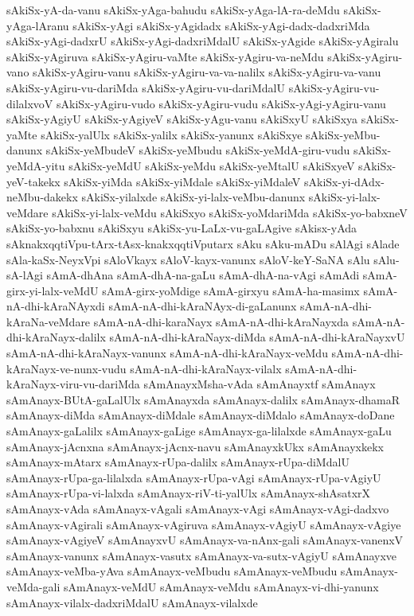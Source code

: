 {sAkiSx-yA-da-vanu
sAkiSx-yAga-bahudu
sAkiSx-yAga-lA-ra-deMdu
sAkiSx-yAga-lAranu
sAkiSx-yAgi
sAkiSx-yAgidadx
sAkiSx-yAgi-dadx-dadxriMda
sAkiSx-yAgi-dadxrU
sAkiSx-yAgi-dadxriMdalU
sAkiSx-yAgide
sAkiSx-yAgiralu
sAkiSx-yAgiruva
sAkiSx-yAgiru-vaMte
sAkiSx-yAgiru-va-neMdu
sAkiSx-yAgiru-vano
sAkiSx-yAgiru-vanu
sAkiSx-yAgiru-va-va-nalilx
sAkiSx-yAgiru-va-vanu
sAkiSx-yAgiru-vu-dariMda
sAkiSx-yAgiru-vu-dariMdalU
sAkiSx-yAgiru-vu-dilalxvoV
sAkiSx-yAgiru-vudo
sAkiSx-yAgiru-vudu
sAkiSx-yAgi-yAgiru-vanu
sAkiSx-yAgiyU
sAkiSx-yAgiyeV
sAkiSx-yAgu-vanu
sAkiSxyU
sAkiSxya
sAkiSx-yaMte
sAkiSx-yalUlx
sAkiSx-yalilx
sAkiSx-yanunx
sAkiSxye
sAkiSx-yeMbu-danunx
sAkiSx-yeMbudeV
sAkiSx-yeMbudu
sAkiSx-yeMdA-giru-vudu
sAkiSx-yeMdA-yitu
sAkiSx-yeMdU
sAkiSx-yeMdu
sAkiSx-yeMtalU
sAkiSxyeV
sAkiSx-yeV-takekx
sAkiSx-yiMda
sAkiSx-yiMdale
sAkiSx-yiMdaleV
sAkiSx-yi-dAdx-neMbu-dakekx
sAkiSx-yilalxde
sAkiSx-yi-lalx-veMbu-danunx
sAkiSx-yi-lalx-veMdare
sAkiSx-yi-lalx-veMdu
sAkiSxyo
sAkiSx-yoMdariMda
sAkiSx-yo-babxneV
sAkiSx-yo-babxnu
sAkiSxyu
sAkiSx-yu-LaLx-vu-gaLAgive
sAkisx-yAda
sAknakxqqtiVpu-tArx-tAsx-knakxqqtiVputarx
sAku
sAku-mADu
sAlAgi
sAlade
sAla-kaSx-NeyxVpi
sAloVkayx
sAloV-kayx-vanunx
sAloV-keY-SaNA
sAlu
sAlu-sA-lAgi
sAmA-dhAna
sAmA-dhA-na-gaLu
sAmA-dhA-na-vAgi
sAmAdi
sAmA-girx-yi-lalx-veMdU
sAmA-girx-yoMdige
sAmA-girxyu
sAmA-ha-masimx
sAmA-nA-dhi-kAraNAyxdi
sAmA-nA-dhi-kAraNAyx-di-gaLanunx
sAmA-nA-dhi-kAraNa-veMdare
sAmA-nA-dhi-karaNayx
sAmA-nA-dhi-kAraNayxda
sAmA-nA-dhi-kAraNayx-dalilx
sAmA-nA-dhi-kAraNayx-diMda
sAmA-nA-dhi-kAraNayxvU
sAmA-nA-dhi-kAraNayx-vanunx
sAmA-nA-dhi-kAraNayx-veMdu
sAmA-nA-dhi-kAraNayx-ve-nunx-vudu
sAmA-nA-dhi-kAraNayx-vilalx
sAmA-nA-dhi-kAraNayx-viru-vu-dariMda
sAmAnayxMsha-vAda
sAmAnayxtf
sAmAnayx
sAmAnayx-BUtA-gaLalUlx
sAmAnayxda
sAmAnayx-dalilx
sAmAnayx-dhamaR
sAmAnayx-diMda
sAmAnayx-diMdale
sAmAnayx-diMdalo
sAmAnayx-doDane
sAmAnayx-gaLalilx
sAmAnayx-gaLige
sAmAnayx-ga-lilalxde
sAmAnayx-gaLu
sAmAnayx-jAcnxna
sAmAnayx-jAcnx-navu
sAmAnayxkUkx
sAmAnayxkekx
sAmAnayx-mAtarx
sAmAnayx-rUpa-dalilx
sAmAnayx-rUpa-diMdalU
sAmAnayx-rUpa-ga-lilalxda
sAmAnayx-rUpa-vAgi
sAmAnayx-rUpa-vAgiyU
sAmAnayx-rUpa-vi-lalxda
sAmAnayx-riV-ti-yalUlx
sAmAnayx-shAsatxrX
sAmAnayx-vAda
sAmAnayx-vAgali
sAmAnayx-vAgi
sAmAnayx-vAgi-dadxvo
sAmAnayx-vAgirali
sAmAnayx-vAgiruva
sAmAnayx-vAgiyU
sAmAnayx-vAgiye
sAmAnayx-vAgiyeV
sAmAnayxvU
sAmAnayx-va-nAnx-gali
sAmAnayx-vanenxV
sAmAnayx-vanunx
sAmAnayx-vasutx
sAmAnayx-va-sutx-vAgiyU
sAmAnayxve
sAmAnayx-veMba-yAva
sAmAnayx-veMbudu
sAmAnayx-veMbudu
sAmAnayx-veMda-gali
sAmAnayx-veMdU
sAmAnayx-veMdu
sAmAnayx-vi-dhi-yanunx
sAmAnayx-vilalx-dadxriMdalU
sAmAnayx-vilalxde
}
